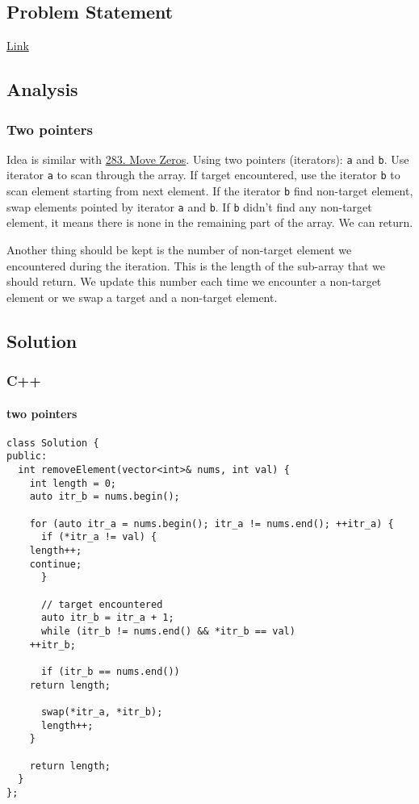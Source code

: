 \documentclass[11pt]{article}
\begin{document}
\subsection{Problem Statement}
\label{sec:orgc67d073}
\href{https://leetcode.com/problems/remove-element/}{Link}
\subsection{Analysis}
\label{sec:orge6e42b9}
\subsubsection{Two pointers}
\label{sec:org1b5ddec}
Idea is similar with \hyperref[org97258c4]{283. Move Zeros}. Using two pointers (iterators): \texttt{a} and \texttt{b}. Use iterator \texttt{a} to scan through the array. If target encountered, use the iterator \texttt{b} to scan element starting from next element. If the iterator \texttt{b} find non-target element, swap elements pointed by iterator \texttt{a} and \texttt{b}. If \texttt{b} didn't find any non-target element, it means there is none in the remaining part of the array. We can return.

Another thing should be kept is the number of non-target element we encountered during the iteration. This is the length of the sub-array that we should return. We update this number each time we encounter a non-target element or we swap a target and a non-target element.

\subsection{Solution}
\label{sec:org0867f09}
\subsubsection{C++}
\label{sec:org70608c8}
\paragraph{two pointers}
\label{sec:org760ebc3}
\begin{verbatim}
class Solution {
public:
  int removeElement(vector<int>& nums, int val) {
    int length = 0;
    auto itr_b = nums.begin();

    for (auto itr_a = nums.begin(); itr_a != nums.end(); ++itr_a) {
      if (*itr_a != val) {
	length++;
	continue;
      }

      // target encountered
      auto itr_b = itr_a + 1;
      while (itr_b != nums.end() && *itr_b == val)
	++itr_b;

      if (itr_b == nums.end())
	return length;

      swap(*itr_a, *itr_b);
      length++;
    }

    return length;
  }
};
\end{verbatim}
\end{document}

